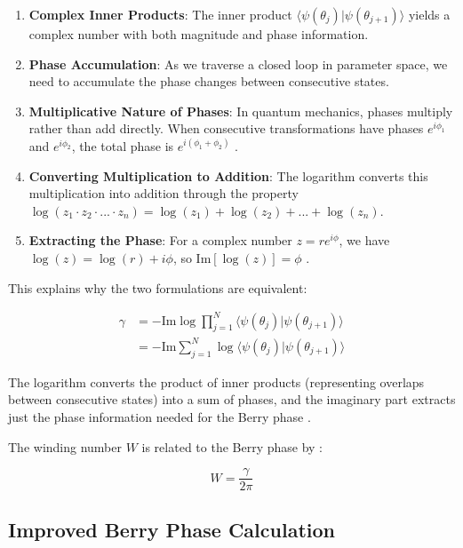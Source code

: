\documentclass{article}
\begin{document}
\begin{enumerate}
    \item \textbf{Complex Inner Products}: The inner product $\langle \psi(\theta_j) | \psi(\theta_{j+1}) \rangle$ yields a complex number with both magnitude and phase information.
    
    \item \textbf{Phase Accumulation}: As we traverse a closed loop in parameter space, we need to accumulate the phase changes between consecutive states.
    
    \item \textbf{Multiplicative Nature of Phases}: In quantum mechanics, phases multiply rather than add directly. When consecutive transformations have phases $e^{i\phi_1}$ and $e^{i\phi_2}$, the total phase is $e^{i(\phi_1+\phi_2)}$ \cite{Griffiths2017}.
    
    \item \textbf{Converting Multiplication to Addition}: The logarithm converts this multiplication into addition through the property $\log(z_1 \cdot z_2 \cdot ... \cdot z_n) = \log(z_1) + \log(z_2) + ... + \log(z_n)$.
    
    \item \textbf{Extracting the Phase}: For a complex number $z = re^{i\phi}$, we have $\log(z) = \log(r) + i\phi$, so $\text{Im}[\log(z)] = \phi$ \cite{Bohm2003}.
\end{enumerate}

This explains why the two formulations are equivalent:

\begin{align}
\gamma &= -\text{Im} \log \prod_{j=1}^{N} \langle \psi(\theta_j) | \psi(\theta_{j+1}) \rangle \\
&= -\text{Im} \sum_{j=1}^{N} \log \langle \psi(\theta_j) | \psi(\theta_{j+1}) \rangle
\end{align}

The logarithm converts the product of inner products (representing overlaps between consecutive states) into a sum of phases, and the imaginary part extracts just the phase information needed for the Berry phase \cite{Resta2000, Bohm2003}.

The winding number $W$ is related to the Berry phase by \cite{Park2011, Liang2015}:

\begin{equation}
W = \frac{\gamma}{2\pi}
\end{equation}

\subsection{Improved Berry Phase Calculation}
\end{document}
